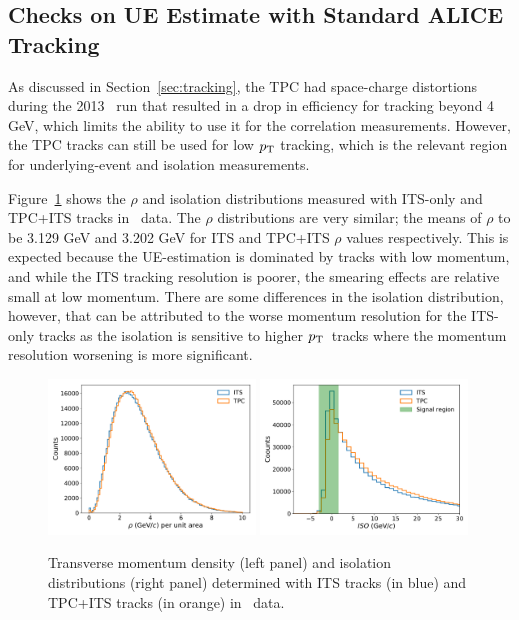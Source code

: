 \subsection{Checks on UE Estimate with Standard ALICE Tracking}
As discussed in Section~\ref{sec:tracking}, the TPC had space-charge distortions during the 2013 \pPb~run that resulted in a drop in efficiency for tracking beyond 4 GeV, which limits the ability to use it for the correlation measurements. However, the TPC tracks can still be used for low $p_{\mathrm{T}}$ tracking, which is the relevant region for underlying-event and isolation measurements. 

Figure~\ref{fig:pPb_its_tpc_rho} shows the $\rho$  and isolation distributions measured with ITS-only and TPC+ITS tracks in \pPb~data. The $\rho$ distributions are very similar; the means of $\rho$ to be 3.129 GeV and 3.202 GeV for ITS and TPC+ITS $\rho$ values respectively. This is expected because the UE-estimation is dominated by tracks with low momentum, and while the ITS tracking resolution is poorer, the smearing effects are relative small at low momentum. There are some differences in the isolation distribution, however, that can be attributed to the worse momentum resolution for the ITS-only tracks as the isolation is sensitive to higher $p_{\mathrm{T}}$~tracks where the momentum resolution worsening is more significant. 

\begin{figure}
	\center
	\includegraphics[width=0.49\textwidth]{Checks_Systematics/UEestimate_Skimmed_13def.pdf}
		\includegraphics[width=0.49\textwidth]{Checks_Systematics/IsolationTPC_Skimmed_13def.pdf}
	\caption{Transverse momentum density (left panel) and isolation distributions (right panel) determined with ITS tracks (in blue) and TPC+ITS tracks (in orange) in \pPb~data.}
	\label{fig:pPb_its_tpc_rho}
\end{figure}

